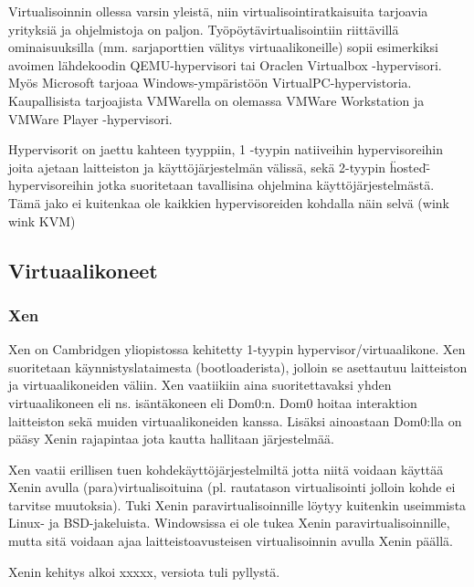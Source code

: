 Virtualisoinnin ollessa varsin yleistä, niin virtualisointiratkaisuita tarjoavia yrityksiä ja ohjelmistoja on paljon. Työpöytävirtualisointiin riittävillä ominaisuuksilla (mm. sarjaporttien välitys virtuaalikoneille) sopii esimerkiksi avoimen lähdekoodin QEMU-hypervisori tai Oraclen Virtualbox -hypervisori. Myös Microsoft tarjoaa Windows-ympäristöön VirtualPC-hypervistoria. Kaupallisista tarjoajista VMWarella on olemassa VMWare Workstation ja VMWare Player -hypervisori.

Hypervisorit on jaettu kahteen tyyppiin, 1 -tyypin natiiveihin hypervisoreihin joita ajetaan laitteiston ja käyttöjärjestelmän välissä, sekä 2-tyypin \"hosted\" -hypervisoreihin jotka suoritetaan tavallisina ohjelmina käyttöjärjestelmästä. Tämä jako ei kuitenkaa ole kaikkien hypervisoreiden kohdalla näin selvä (wink wink KVM)


\subsection{Virtuaalikoneet}
\subsubsection{Xen}
Xen on Cambridgen yliopistossa kehitetty 1-tyypin hypervisor/virtuaalikone. Xen suoritetaan käynnistyslataimesta (bootloaderista), jolloin se asettautuu laitteiston ja virtuaalikoneiden väliin. Xen vaatiikiin aina suoritettavaksi yhden virtuaalikoneen eli ns. isäntäkoneen eli Dom0:n. Dom0 hoitaa interaktion laitteiston sekä muiden virtuaalikoneiden kanssa. Lisäksi ainoastaan Dom0:lla on pääsy Xenin rajapintaa jota kautta hallitaan järjestelmää.

Xen vaatii erillisen tuen kohdekäyttöjärjestelmiltä jotta niitä voidaan käyttää Xenin avulla (para)virtualisoituina (pl. rautatason virtualisointi jolloin kohde ei tarvitse muutoksia). Tuki Xenin paravirtualisoinnille löytyy kuitenkin useimmista Linux- ja BSD-jakeluista. Windowsissa ei ole tukea Xenin paravirtualisoinnille, mutta sitä voidaan ajaa laitteistoavusteisen virtualisoinnin avulla Xenin päällä.

Xenin kehitys alkoi xxxxx, versiota tuli pyllystä.


